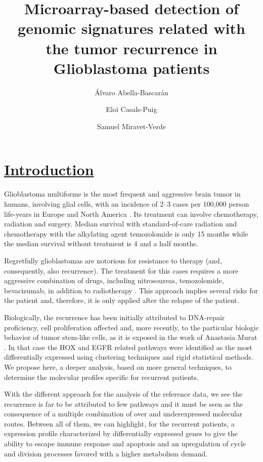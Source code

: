 \documentclass[9pt,twocolumn,twoside]{gsajnl}
\title{Microarray-based detection of genomic signatures related with the tumor recurrence in Glioblastoma patients}
\author[$\ast$,1]{Álvaro Abella-Bascarán}
\author[$\ast$]{Eloi Casals-Puig}
\author[$\ast$]{Samuel Miravet-Verde}
\affil[$\ast$]{Pompeu Fabra University, Barcelona (Spain)}
\begin{document}
\maketitle
\thispagestyle{firststyle}
\marginmark
\firstpagefootnote
{}

\vspace{-1cm}
\section*{\underline{Introduction}}



Glioblastoma multiforme is the most frequent and aggressive brain tumor in humans, involving glial cells, with an incidence of 2–3 cases per 100,000 person life-years in Europe and North America \citep{Bleeker2012}. Its treatment can involve chemotherapy, radiation and surgery. Median survival with standard-of-care radiation and chemotherapy with the alkylating agent temozolomide is only 15 months  \citep{Johnson2012} while the median survival without treatment is 4 and a half months. 

Regretfully glioblastomas are notorious for resistance to therapy (and, consequently, also recurrence). The treatment for this cases requires a more aggressive combination of drugs, including nitrosoureas, temozolomide, bevacizumab, in addition to radiotherapy \citep{Weller2013}. This approach implies several risks for the patient and, therefore, it is only applied after the relapse of the patient.

Biologically, the recurrence has been initially attributed to DNA-repair proficiency, cell proliferation affected and, more recently, to the particular biologic behavior of tumor stem-like cells, as it is exposed in the work of Anastasia Murat \citep{Murat2008}. In that case the HOX and EGFR related pathways were identified as the most differentially expressed using clustering techniques and rigid statistical methods. We propose here, a deeper analysis, based on more general techniques, to determine the molecular profiles specific for recurrent patients.

With the different approach for the analysis of the reference data, we see the recurrence is far to be attributed to few pathways and it must be seen as the consequence of a multiple combination of over and underexpressed molecular routes. Between all of them, we can highlight, for the recurrent patients, a expression profile characterized by differentially expressed genes to give the ability to escape immune response and apoptosis and an upregulation of cycle and division processes favored with a higher metabolism demand. 
\end{document}
